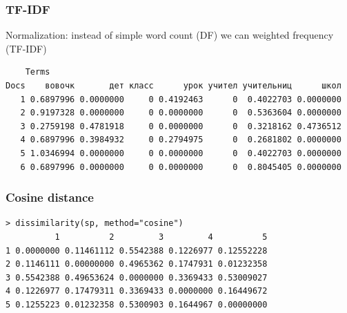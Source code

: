 \documentclass[svgnames]{beamer}
\begin{document}
\begin{frame}[fragile]
  \frametitle{TF-IDF}
  Normalization: instead of simple word count (DF) we can weighted frequency  (TF-IDF)
  \footnotesize
\begin{verbatim}
    Terms
Docs    вовочк       дет класс      урок учител учительниц      школ
   1 0.6897996 0.0000000     0 0.4192463      0  0.4022703 0.0000000
   2 0.9197328 0.0000000     0 0.0000000      0  0.5363604 0.0000000
   3 0.2759198 0.4781918     0 0.0000000      0  0.3218162 0.4736512
   4 0.6897996 0.3984932     0 0.2794975      0  0.2681802 0.0000000
   5 1.0346994 0.0000000     0 0.0000000      0  0.4022703 0.0000000
   6 0.6897996 0.0000000     0 0.0000000      0  0.8045405 0.0000000
\end{verbatim}
\end{frame}

\begin{frame}[fragile]
  \frametitle{Cosine distance}

  \footnotesize
\begin{verbatim}
> dissimilarity(sp, method="cosine")
          1          2         3         4          5
1 0.0000000 0.11461112 0.5542388 0.1226977 0.12552228
2 0.1146111 0.00000000 0.4965362 0.1747931 0.01232358
3 0.5542388 0.49653624 0.0000000 0.3369433 0.53009027
4 0.1226977 0.17479311 0.3369433 0.0000000 0.16449672
5 0.1255223 0.01232358 0.5300903 0.1644967 0.00000000
\end{verbatim}

\end{frame}
\end{document}
